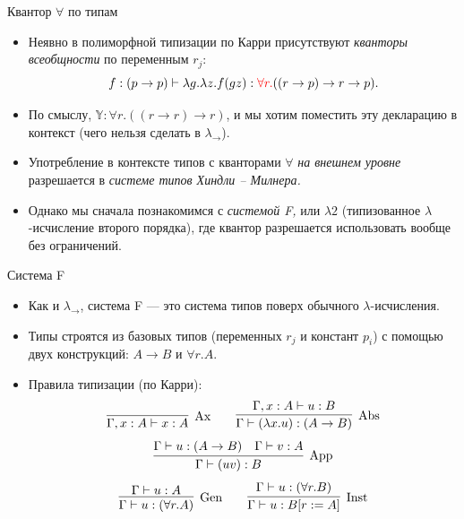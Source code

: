 \documentclass[xcolor=dvipsnames]{beamer}
\newcommand{\Yb}{\mathbb{Y}}
\begin{document}
\begin{frame}{Квантор $\forall$ по типам}

\begin{itemize}[<+->]
 \item Неявно в полиморфной типизации по Карри присутствуют {\em кванторы всеобщности} по переменным $r_j$:
 \[
  f : (p \to p) \vdash 
  \lambda g . \lambda z. f (g z) :
  {\color{red} \forall r.} 
  ((r \to p) \to r \to p).
 \]
 \item По смыслу, $\Yb : \forall r . ((r \to r) \to r)$, и мы хотим поместить эту декларацию в контекст (чего нельзя сделать в $\lambda_\to$).
 \item Употребление в контексте типов с кванторами $\forall$
 {\em на внешнем уровне} разрешается в {\em системе типов Хиндли -- Милнера.}
 \item Однако мы сначала познакомимся с {\em системой F,} или $\lambda 2$ (типизованное $\lambda$-исчисление второго порядка), где квантор разрешается использовать вообще без ограничений.
\end{itemize}

 
\end{frame}


\begin{frame}{Система F}
 
 \begin{itemize}[<+->]
  \item Как и $\lambda_\to$, система F --- это система типов поверх обычного $\lambda$-исчисления.
  \item Типы строятся из базовых типов (переменных $r_j$ и констант $p_i$) с помощью двух конструкций: $A \to B$ и $\forall r. A$.
  \item Правила типизации (по Карри):
  \[
   \infer[\mathrm{Ax}]
   {\Gamma, x : A \vdash x : A}{}
   \qquad
   \infer[\mathrm{Abs}]
   {\Gamma \vdash (\lambda x. u) : (A \to B)}
   {\Gamma, x : A \vdash u : B}
  \]
  \[
   \infer[\mathrm{App}]
   {\Gamma \vdash (uv) : B}
   {\Gamma \vdash u : (A \to B) &
   \Gamma \vdash v : A}
  \]
  \[
   \infer[\mathrm{Gen}]
   {\Gamma \vdash u : (\forall r. A)}
   {\Gamma \vdash u : A}
   \qquad
   \infer[\mathrm{Inst}]
   {\Gamma \vdash u : B[r := A]}
   {\Gamma \vdash u : (\forall r. B)}
  \]

 \end{itemize}

 
\end{frame}
\end{document}
